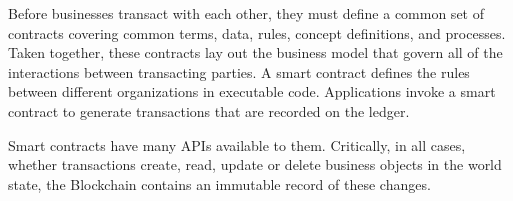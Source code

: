 Before businesses transact with each other, they must define a common set of contracts covering common terms, data, rules, concept definitions, and processes. Taken together, these contracts lay out the business model that govern all of the interactions between transacting parties. A smart contract defines the rules between different organizations in executable code. Applications invoke a smart contract to generate transactions that are recorded on the ledger.

Smart contracts have many APIs available to them. Critically, in all cases, whether transactions create, read, update or delete business objects in the world state, the Blockchain contains an immutable record of these changes.

